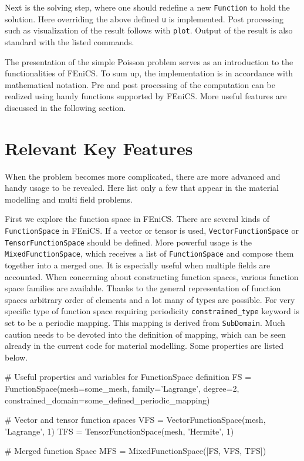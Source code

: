 \documentclass[10pt,a4paper]{scrreprt}
\begin{document}
Next is the solving step, where one should redefine a new \texttt{Function} to hold the solution. Here overriding the above defined \texttt{u} is implemented. Post processing such as visualization of the result follows with \texttt{plot}. Output of the result is also standard with the listed commands.

The presentation of the simple Poisson problem serves as an introduction to the functionalities of FEniCS. To sum up, the implementation is in accordance with mathematical notation. Pre and post processing of the computation can be realized using handy functions supported by FEniCS. More useful features are discussed in the following section.

\section{Relevant Key Features}
When the problem becomes more complicated, there are more advanced and handy usage to be revealed. Here list only a few that appear in the material modelling and multi field problems.

First we explore the function space in FEniCS. There are several kinds of \texttt{FunctionSpace} in FEniCS. If a vector or tensor is used, \texttt{VectorFunctionSpace} or \texttt{TensorFunctionSpace} should be defined. More powerful usage is the \texttt{MixedFunctionSpace}, which receives a list of \texttt{FunctionSpace} and compose them together into a merged one. It is especially useful when multiple fields are accounted. When concerning about constructing function spaces, various function space families are available. Thanks to the general representation of function spaces arbitrary order of elements and a lot many of types are possible. For very specific type of function space requiring periodicity \texttt{constrained\_type} keyword is set to be a periodic mapping. This mapping is derived from \texttt{SubDomain}. Much caution needs to be devoted into the definition of mapping, which can be seen already in the current code for material modelling. Some properties are listed below.

\begin{python}
# Useful properties and variables for FunctionSpace definition
FS = FunctionSpace(mesh=some_mesh, family='Lagrange', degree=2, constrained_domain=some_defined_periodic_mapping)

# Vector and tensor function spaces
VFS = VectorFunctionSpace(mesh, 'Lagrange', 1)
TFS = TensorFunctionSpace(mesh, 'Hermite', 1)

# Merged function Space
MFS = MixedFunctionSpace([FS, VFS, TFS])
\end{python}
\end{document}
